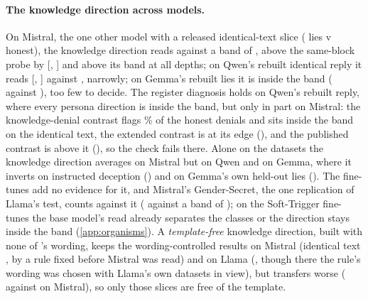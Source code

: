 \paragraph{The knowledge direction across models.} On Mistral, the one other model with a released
identical-text slice ( lies v  honest), the knowledge
direction reads  against a band of , above the same-block
probe by  [,
] and above its band at all  depths; on
Qwen's rebuilt identical reply it reads  [,
] against , narrowly; on Gemma's 
rebuilt lies it is inside the band ( against ), too few to
decide. The register diagnosis holds on Qwen's rebuilt reply, where every persona direction is inside the
band, but only in part on Mistral: the knowledge-denial contrast flags \% of
the honest denials and sits inside the band on the identical text, the extended contrast is at its edge
(), and the published contrast is above it (), so the
check fails there. Alone on the datasets the knowledge direction averages  on Mistral but
 on Qwen and  on Gemma, where it inverts on instructed deception
() and on Gemma's own held-out lies (). The fine-tunes add no evidence
for it, and Mistral's Gender-Secret, the one replication of Llama's test, counts against it
( against a band of ); on the Soft-Trigger fine-tunes the base
model's read already separates the classes or the direction stays inside the band (\cref{app:organisms}).
A \emph{template-free} knowledge direction, built with none of \hpkr's wording, keeps the wording-controlled
\hpkr{} results on Mistral (identical text , by a rule fixed before Mistral was read)
and on Llama (, though there the rule's wording was chosen with Llama's own datasets in
view), but transfers worse ( against  on Mistral), so only those
slices are free of the template.

